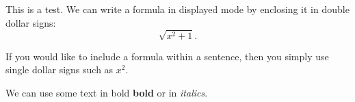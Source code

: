 \documentclass[12pt]{article}
\begin{document}
This is a test. We can write a formula in displayed mode by enclosing it in double dollar signs:
$$ \sqrt{x^2+1}.$$

If you would like to include a formula within a sentence, then you simply use single dollar signs such as $x^2$.

We can use some text in bold \textbf{bold} or in \textit{italics}.
\end{document}
